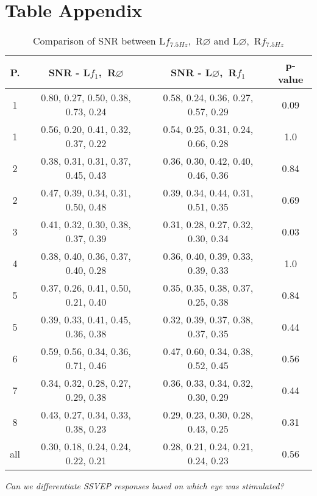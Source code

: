 \chapter{Table Appendix}
\label{app:T}

\begin{table}[htbp]
  \centering
  \begin{tabularx}{\textwidth}{cccc}
      \hline     
      {\textbf{P.}} & {\textbf{SNR - L$f_{1}$,~R$\varnothing$}} & \textbf{SNR - L$\varnothing$,~R$f_{1}$} & \multicolumn{1}{c}{\textbf{p-value}}\\
      \hline
      1 & 0.80, 0.27, 0.50, 0.38, 0.73, 0.24 & 0.58, 0.24, 0.36, 0.27, 0.57, 0.29 &  0.09 \\
      1 & 0.56, 0.20, 0.41, 0.32, 0.37, 0.22 & 0.54, 0.25, 0.31, 0.24, 0.66, 0.28 &  1.0 \\
      2 & 0.38, 0.31, 0.31, 0.37, 0.45, 0.43 & 0.36, 0.30, 0.42, 0.40, 0.46, 0.36 &  0.84 \\
      2 & 0.47, 0.39, 0.34, 0.31, 0.50, 0.48 & 0.39, 0.34, 0.44, 0.31, 0.51, 0.35 &  0.69 \\
      3 & 0.41, 0.32, 0.30, 0.38, 0.37, 0.39 & 0.31, 0.28, 0.27, 0.32, 0.30, 0.34 &  0.03 \\
      4 & 0.38, 0.40, 0.36, 0.37, 0.40, 0.28 & 0.36, 0.40, 0.39, 0.33, 0.39, 0.33 &  1.0 \\
      5 & 0.37, 0.26, 0.41, 0.50, 0.21, 0.40 & 0.35, 0.35, 0.38, 0.37, 0.25, 0.38 &  0.84 \\
      5 & 0.39, 0.33, 0.41, 0.45, 0.36, 0.38 & 0.32, 0.39, 0.37, 0.38, 0.37, 0.35 &  0.44 \\
      6 & 0.59, 0.56, 0.34, 0.36, 0.71, 0.46 & 0.47, 0.60, 0.34, 0.38, 0.52, 0.45 &  0.56 \\
      7 & 0.34, 0.32, 0.28, 0.27, 0.29, 0.38 & 0.36, 0.33, 0.34, 0.32, 0.30, 0.29 &  0.44 \\
      8 & 0.43, 0.27, 0.34, 0.33, 0.38, 0.23 & 0.29, 0.23, 0.30, 0.28, 0.43, 0.25 &  0.31 \\
      all & 0.30, 0.18, 0.24, 0.24, 0.22, 0.21 & 0.28, 0.21, 0.24, 0.21, 0.24, 0.23 & 0.56 \\
      \hline
  \end{tabularx}
  \caption{Comparison of SNR between L$f_{7.5 Hz}$,~R$\varnothing$ and L$\varnothing$,~R$f_{7.5 Hz}$}
  \emph{Can we differentiate SSVEP responses based on which eye was stimulated?}
  \label{tab:rq1c1}
\end{table}

